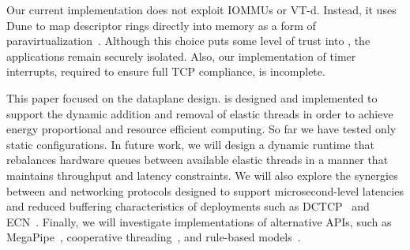 \begin{comment}
\myparagraph{Using interrupts as a fallback:} Some applications
service requests that require extended intervals of
compute time. We intend for these requests to be delegated
to background threads rather than elastic threads in order
to ensure that elastic threads remain responsive.
However, \ix could also be modified to better tolorate
unanticipated delays during application processing in elastic threads.
One option would be to use interrupts as a fallback mode. On the receive side, we
could program the NIC to fire an interrupt whenever the
recieve descriptor ring is almost full. The dataplane could
then move packets from the receive ring to a structure in software, averting
buffer underrun. On the transmit side, we could program
the NIC to fire an interrupt whenever the transmit ring becomes
empty so that it can be refilled. Such an interrupt would only need
to be armed when there is additional transmit data pending. A desirable
property of this approach is that neither interrupt would
be triggered as long as elastic threads are sufficiently responsive,
but if an elastic thread misbehaves, the \ix dataplane would
be able to regain control and catch up on network processing.
\end{comment}





 Our current
implementation does not exploit IOMMUs or VT-d. Instead, it uses Dune
to map descriptor rings directly into \ix memory as a form of
paravirtualization~\cite{DBLP:conf/sosp/BarhamDFHHHN03}.  Although
this choice puts some level of trust into \ix, the applications remain
securely isolated.  Also, our implementation of timer interrupts,
required to ensure full TCP compliance, is incomplete.

 This paper focused on the \ix dataplane
design. \ix is designed and implemented to support the dynamic
addition and removal of elastic threads in order to achieve energy
proportional and resource efficient computing. So far we have tested
only static configurations. In future work, we will design a dynamic
runtime that rebalances hardware queues between available elastic
threads in a manner that maintains throughput and latency constraints.
We will also explore the synergies between \ix and networking
protocols designed to support microsecond-level latencies and reduced
buffering characteristics of \ix deployments such as
DCTCP~\cite{DBLP:conf/sigcomm/AlizadehGMPPPSS10} and
ECN~\cite{ramakrishnan2001addition}. Finally, we will investigate \ix
implementations of alternative APIs, such as
MegaPipe~\cite{DBLP:conf/osdi/HanMCR12}, cooperative
threading~\cite{DBLP:conf/sosp/BehrenCZNB03}, and rule-based
models~\cite{DBLP:conf/hotos/StutsmanO13}.

